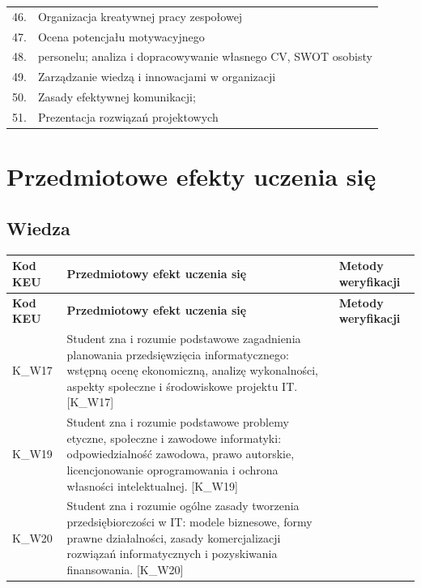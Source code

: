\documentclass[12pt, a4paper]{article}
\newcommand{\thdrule}{\noalign{\global\setlength{\extrarowheight}{0pt}}}
\newcommand{\thdend}{\noalign{\global\setlength{\extrarowheight}{3pt}}}
\begin{document}
{\begin{longtable}{m{1.5cm}m{14.5cm}}
  \rowcolor{tableRowAlt} 46. & Organizacja kreatywnej pracy zespołowej \\
  \rowcolor{tableRowLight} 47. & Ocena potencjału motywacyjnego \\
  \rowcolor{tableRowAlt} 48. & personelu; analiza i dopracowywanie własnego CV, SWOT osobisty \\
  \rowcolor{tableRowLight} 49. & Zarządzanie wiedzą i innowacjami w organizacji \\
  \rowcolor{tableRowAlt} 50. & Zasady efektywnej komunikacji; \\
  \rowcolor{tableRowLight} 51. & Prezentacja rozwiązań projektowych \\
\bottomrule
\end{longtable}}

\section{Przedmiotowe efekty uczenia się}

\subsection*{Wiedza}
{\scriptsize
\begin{longtable}{m{1.6cm}m{9.0cm}m{4.2cm}}
\thdrule\toprule
\rowcolor{pjatkRed} {\color{white}\footnotesize\textbf{\vphantom{Ag}Kod KEU}} & {\color{white}\footnotesize\textbf{\vphantom{Ag}Przedmiotowy efekt uczenia się}} & {\color{white}\footnotesize\textbf{\vphantom{Ag}Metody weryfikacji}} \\
\midrule\thdend
\endfirsthead
\thdrule\toprule
\rowcolor{pjatkRed} {\color{white}\footnotesize\textbf{\vphantom{Ag}Kod KEU}} & {\color{white}\footnotesize\textbf{\vphantom{Ag}Przedmiotowy efekt uczenia się}} & {\color{white}\footnotesize\textbf{\vphantom{Ag}Metody weryfikacji}} \\
\midrule\thdend
\endhead
  \rowcolor{tableRowLight} K\_W17 & Student zna i rozumie podstawowe zagadnienia planowania przedsięwzięcia informatycznego: wstępną ocenę ekonomiczną, analizę wykonalności, aspekty społeczne i środowiskowe projektu IT. {[}K\_W17{]} &  \\
  \rowcolor{tableRowAlt} K\_W19 & Student zna i rozumie podstawowe problemy etyczne, społeczne i zawodowe informatyki: odpowiedzialność zawodowa, prawo autorskie, licencjonowanie oprogramowania i ochrona własności intelektualnej. {[}K\_W19{]} &  \\
  \rowcolor{tableRowLight} K\_W20 & Student zna i rozumie ogólne zasady tworzenia przedsiębiorczości w IT: modele biznesowe, formy prawne działalności, zasady komercjalizacji rozwiązań informatycznych i pozyskiwania finansowania. {[}K\_W20{]} &  \\
\bottomrule
\end{longtable}}
\end{document}
